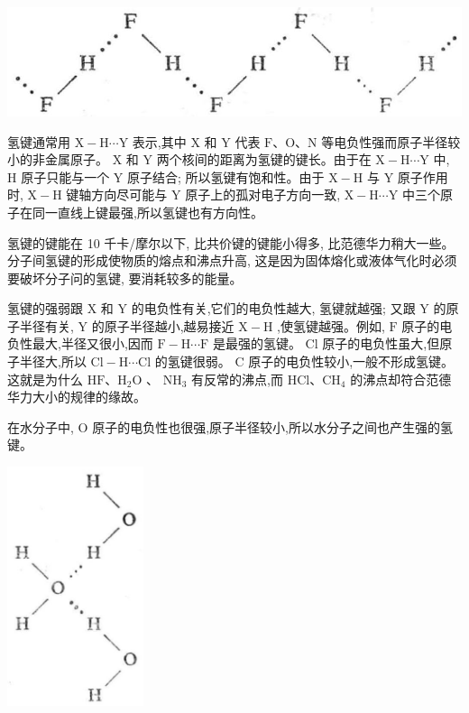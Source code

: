 \documentclass[10pt]{article}
\begin{document}
\begin{center}
\includegraphics[max width=1.0\textwidth]{images/01912d13-9986-7822-a012-3f3f7be99dcb_29_731384.jpg}
\end{center}

氢键通常用 \(\mathrm{X} - \mathrm{H}\cdots \mathrm{Y}\) 表示,其中 \(\mathrm{X}\) 和 \(\mathrm{Y}\) 代表 \(\mathrm{F}\text{、}\mathrm{O}\text{、}\mathrm{N}\) 等电负性强而原子半径较小的非金属原子。 \(\mathrm{X}\) 和 \(\mathrm{Y}\) 两个核间的距离为氢键的键长。由于在 \(\mathrm{X} - \mathrm{H}\cdots \mathrm{Y}\) 中, \(\mathrm{H}\) 原子只能与一个 \(\mathrm{Y}\) 原子结合; 所以氢键有饱和性。由于 \(\mathrm{X} - \mathrm{H}\) 与 \(\mathrm{Y}\) 原子作用时, \(\mathrm{X} - \mathrm{H}\) 键轴方向尽可能与 \(\mathrm{Y}\) 原子上的孤对电子方向一致, \(\mathrm{X} - \mathrm{H}\cdots \mathrm{Y}\) 中三个原子在同一直线上键最强,所以氢键也有方向性。

氢键的键能在 10 千卡/摩尔以下, 比共价键的键能小得多, 比范德华力稍大一些。分子间氢键的形成使物质的熔点和沸点升高, 这是因为固体熔化或液体气化时必须要破坏分子问的氢键, 要消耗较多的能量。

氢键的强弱跟 \(\mathrm{X}\) 和 \(\mathrm{Y}\) 的电负性有关,它们的电负性越大, 氢键就越强; 又跟 \(\mathrm{Y}\) 的原子半径有关, \(\mathrm{Y}\) 的原子半径越小,越易接近 \(\mathrm{X} - \mathrm{H}\) ,使氢键越强。例如, \(\mathrm{F}\) 原子的电负性最大,半径又很小,因而 \(\mathrm{F} - \mathrm{H}\cdots \mathrm{F}\) 是最强的氢键。 \(\mathrm{{Cl}}\) 原子的电负性虽大,但原子半径大,所以 \(\mathrm{{Cl}} - \mathrm{H}\cdots \mathrm{{Cl}}\) 的氢键很弱。 \(\mathrm{C}\) 原子的电负性较小,一般不形成氢键。这就是为什么 \(\mathrm{{HF}}\text{、}{\mathrm{H}}_{2}\mathrm{O}\) 、 \({\mathrm{{NH}}}_{3}\) 有反常的沸点,而 \(\mathrm{{HCl}}\text{、}{\mathrm{{CH}}}_{4}\) 的沸点却符合范德华力大小的规律的缘故。

在水分子中, \(\mathrm{O}\) 原子的电负性也很强,原子半径较小,所以水分子之间也产生强的氢键。

\begin{center}
\includegraphics[max width=0.3\textwidth]{images/01912d13-9986-7822-a012-3f3f7be99dcb_30_214898.jpg}
\end{center}
\end{document}
